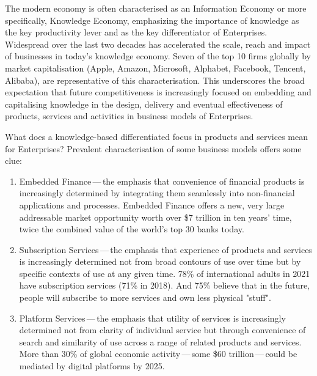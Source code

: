 
The modern economy is often characterised as an Information Economy or more specifically,
Knowledge Economy,
emphasizing the importance of knowledge as the key productivity lever and  as the
key differentiator of Enterprises.
Widespread  over the last two decades has accelerated the scale, reach and impact of
businesses in today’s knowledge economy.
Seven of the top 10 firms globally by market capitalisation (Apple, Amazon,
Microsoft, Alphabet,
Facebook, Tencent, Alibaba),
are representative of this characterisation.
This underscores the broad expectation that future competitiveness is increasingly focused on embedding and
capitalising knowledge in the design, delivery and eventual effectiveness of products, services and activities
in business models of Enterprises.

What does a knowledge-based differentiated focus in products and services mean for Enterprises?
Prevalent characterisation of some business models offers some clue:
\begin{enumerate}[label=(\alph*)]

    \item Embedded Finance\,---\,the emphasis that convenience of financial products is increasingly determined by
          integrating them seamlessly into non-financial applications and processes.
          Embedded Finance offers a new, very large addressable market opportunity worth over \$7 trillion in
          ten years' time, twice the combined value of the world’s top 30 banks today.\autocite{embeddedfinance}

    \item Subscription Services\,---\,the emphasis that experience of products and services is increasingly determined
          not from broad contours of use over time but by specific contexts of use at any given time.
          78\% of international adults in 2021 have subscription services (71\% in 2018).
          And 75\% believe that in the future, people will subscribe to more services and own less physical "stuff".
          \autocite{subscriptioneconomy}

    \item Platform Services\,---\,the emphasis that utility of services is increasingly determined not from clarity of
          individual service but through convenience of search and similarity of use
          across a range of related products and services.
          More than 30\% of global economic activity\,---\,some \$60 trillion\,---\,could be mediated by
          digital platforms by 2025.\autocite{ifyourenotbuilding}

\end{enumerate}

